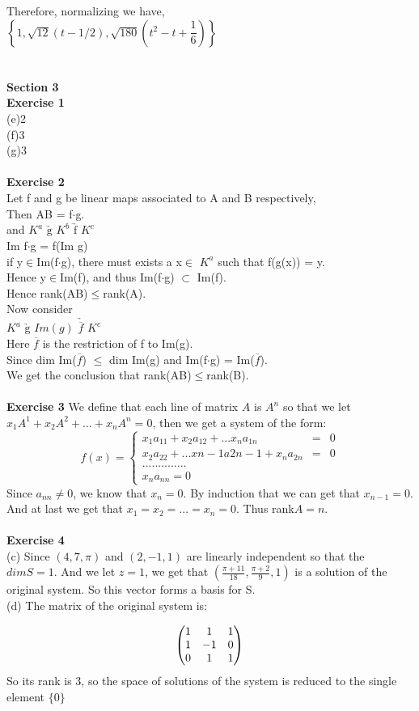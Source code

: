 \documentclass[12pt]{amsart}
\begin{document}
Therefore, normalizing we have,\\
$\left\{{1,\sqrt{12}(t-1/2), \sqrt{180}(t^2-t+\dfrac{1}{6})}\right\}$\\
\\
\\
\textbf{Section 3} \\
\textbf{Exercise 1}\\
(e)2\\
(f)3\\
(g)3\\
\\
\textbf{Exercise 2}\\
Let f and g be linear maps associated to A and B respectively,\\
Then AB = f$\cdot$g.\\
and $K^a$ $\underrightarrow{\text{g}}$ $K^b$ $\underrightarrow{\text{f}}$ $K^c$\\
Im f$\cdot$g = f(Im g)\\
if y$\in$Im(f$\cdot$g), there must exists a x$\in$ $K^a$ such that f(g(x)) = y.\\
Hence y$\in$Im(f), and thus Im(f$\cdot$g) $\subset$ Im(f).\\
Hence rank(AB)$\leq$rank(A).\\
Now consider\\
$K^a$ $\underrightarrow{\text{g}}$ $Im(g)$ $\underrightarrow{\overline{f}}$ $K^c$\\
Here $\overline{f}$ is the restriction of f to Im(g).\\
Since dim Im($\overline{f}$) $\leq$ dim Im(g) and Im(f$\cdot$g) = Im($\overline{f}$).\\
We get the conclusion that rank(AB)$\leq$rank(B).\\
\\
\textbf{Exercise 3}
We define that each line of matrix $A$ is $A^n$ so that we let $x_1A^1+x_2A^2+...+x_nA^n = 0$, then we get a system of the form:
$$ f(x)=\left\{ 
\begin{aligned}
x_1a_{11}+x_2a_{12}+...x_na_{1n} &= & 0 \\
x_2a_{22}+ ... x{n-1}a{2n-1}+x_na_{2n}&=& 0 \\
..............\\
x_na_{nn} =  0
\end{aligned}
\right.
$$
Since $a_{nn} \neq 0$, we know that $x_n=0$. By induction that we can get that $x_{n-1} = 0$. And at last we get that $x_1=x_2=...=x_n=0$. Thus rank$A=n$.\\
\\
\textbf{Exercise 4}\\
(c) Since $(4,7,\pi)$ and $(2,-1,1)$ are linearly independent so that the $dimS = 1$. And we let $z = 1$, we get that $(\frac{\pi+11}{18},\frac{\pi+2}{9},1)$ is a solution of the original system. So this vector forms a basis for S.\\
(d) The matrix of the original system is:

$$\begin{pmatrix} 
1 & 1 & 1\\
1 & -1 &0\\
0 & 1 & 1 
\end{pmatrix}\\
$$
So its rank is 3, so the space of solutions of the system is reduced to the single element $\{0\}$
\end{document}
